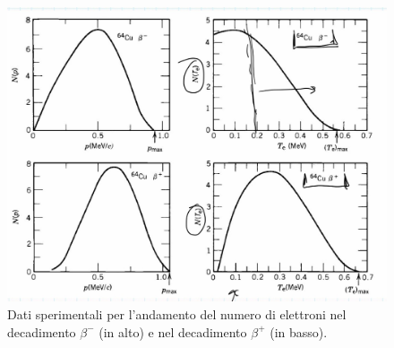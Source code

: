 \begin{figure}[h]
    \centering
    \includegraphics[scale=0.2]{Immagini/0304_andamenti2.png}
    \caption{Dati sperimentali per l'andamento del numero di elettroni nel decadimento $\beta^-$ (in alto) e nel decadimento $\beta^+$ (in basso).}
    \label{0304_dati}
\end{figure}

